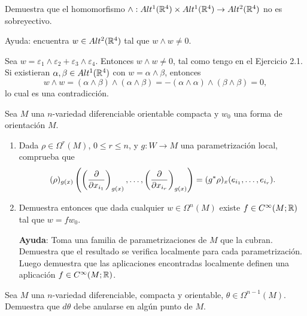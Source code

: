 \documentclass[twoside]{article}
\begin{document}
\newpage

\begin{ejercicio}{2}
Demuestra que el homomorfismo $\land: Alt^1(\mathbb{R}^4)\times Alt^1(\mathbb{R}^4)\to Alt^2(\mathbb{R}^4)$ no es sobreyectivo. 

Ayuda: encuentra $w\in Alt^2(\mathbb{R}^4)$ tal que $w\land w\neq 0$.
\end{ejercicio}
\begin{solucion}
Sea $w=\varepsilon_1\land \varepsilon_2+\varepsilon_3\land\varepsilon_4$. Entonces $w\land w\neq 0$, tal como tengo en el Ejercicio 2.1. Si existieran $\alpha,\beta\in Alt^1(\mathbb{R}^4)$ con $w=\alpha\land\beta$, entonces 
\[
w\land w=(\alpha\land\beta)\land(\alpha\land\beta)=-(\alpha\land\alpha)\land(\beta\land\beta)=0,
\]
lo cual es una contradicción.
\end{solucion}
\newpage

\begin{ejercicio}{3}
Sea $M$ una $n$-variedad diferenciable orientable compacta y $w_0$ una forma de orientación $M$.
\begin{enumerate}
\item Dada $\rho\in\Omega^r(M)$, $0\leq r\leq n$, y $g:W\to M$ una parametrización local, comprueba que
\[
(\rho)_{g(x)}\left(\left(\frac{\partial }{\partial x_{i_1}}\right)_{g(x)},\dots, \left(\frac{\partial }{\partial x_{i_r}}\right)_{g(x)}\right)=(g^*\rho)_x(e_{i_1},\dots, e_{i_r}).
\]
\item Demuestra entonces que dada cualquier $w\in\Omega^n(M)$ existe $f\in C^{\infty}(M;\mathbb{R})$ tal que $w=fw_0$.

\textbf{Ayuda}: Toma una familia de parametrizaciones de $M$ que la cubran. Demuestra que el resultado se verifica localmente para cada parametrización. Luego demuestra que las aplicaciones encontradas localmente definen una aplicación $f\in C^{\infty}(M;\mathbb{R})$.
\end{enumerate}
\end{ejercicio}
\begin{solucion}

\end{solucion}
\newpage

\begin{ejercicio}{4}
Sea $M$ una $n$-variedad diferenciable, compacta y orientable, $\theta\in \Omega^{n-1}(M)$. Demuestra que $d\theta$ debe anularse en algún punto de $M$.
\end{ejercicio}
\begin{solucion}

\end{solucion}
\end{document}

